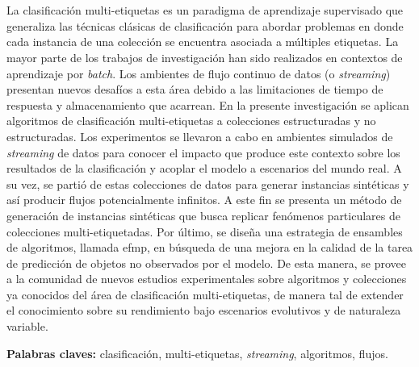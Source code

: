 \chapter*{\runtitulo}

\noindent La clasificación multi-etiquetas es un paradigma de aprendizaje
supervisado que generaliza las técnicas clásicas de clasificación para abordar
problemas en donde cada instancia de una colección se encuentra asociada a
múltiples etiquetas. La mayor parte de los trabajos de investigación han sido
realizados en contextos de aprendizaje por \textit{batch}. Los ambientes de
flujo continuo de datos  (o \textit{streaming}) presentan nuevos desafíos a esta
área debido a las limitaciones de tiempo de respuesta y almacenamiento que
acarrean. En la presente investigación se aplican algoritmos de clasificación
multi-etiquetas a colecciones estructuradas y no estructuradas. Los experimentos
se llevaron a cabo en ambientes simulados de \textit{streaming} de datos para
conocer el impacto que produce este contexto sobre los resultados de la
clasificación y acoplar el modelo a escenarios del mundo real. A su vez, se
partió de estas colecciones de datos para generar instancias sintéticas y así
producir flujos potencialmente infinitos. A este fin se presenta un método de
generación de instancias sintéticas que busca replicar fenómenos particulares de
colecciones multi-etiquetadas. Por último, se diseña una estrategia de ensambles
de algoritmos, llamada \acrlong{efmp}, en búsqueda de una mejora en la calidad de la
tarea de predicción de objetos no observados por el modelo. De esta manera, se
provee a la comunidad de nuevos estudios experimentales sobre algoritmos y
colecciones ya conocidos del área de clasificación multi-etiquetas, de manera
tal de extender el conocimiento sobre su rendimiento bajo escenarios evolutivos
y de naturaleza variable.

\bigskip

\noindent\textbf{Palabras claves:} clasificación, multi-etiquetas, \textit{streaming}, algoritmos, flujos.
